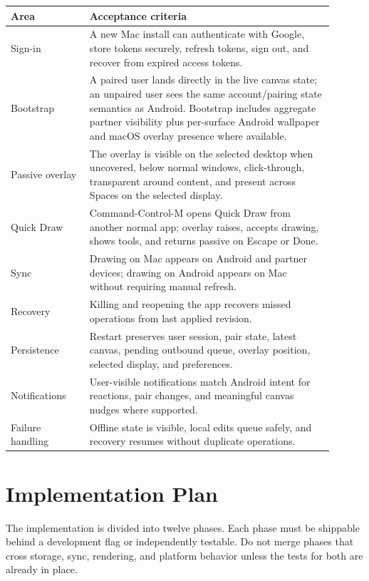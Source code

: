 \documentclass[11pt]{article}
\begin{document}
\begin{longtable}{p{0.22\linewidth} p{0.68\linewidth}}
\toprule
\textbf{Area} & \textbf{Acceptance criteria} \\
\midrule
Sign-in & A new Mac install can authenticate with Google, store tokens securely, refresh tokens, sign out, and recover from expired access tokens. \\
Bootstrap & A paired user lands directly in the live canvas state; an unpaired user sees the same account/pairing state semantics as Android. Bootstrap includes aggregate partner visibility plus per-surface Android wallpaper and macOS overlay presence where available. \\
Passive overlay & The overlay is visible on the selected desktop when uncovered, below normal windows, click-through, transparent around content, and present across Spaces on the selected display. \\
Quick Draw & Command-Control-M opens Quick Draw from another normal app; overlay raises, accepts drawing, shows tools, and returns passive on Escape or Done. \\
Sync & Drawing on Mac appears on Android and partner devices; drawing on Android appears on Mac without requiring manual refresh. \\
Recovery & Killing and reopening the app recovers missed operations from last applied revision. \\
Persistence & Restart preserves user session, pair state, latest canvas, pending outbound queue, overlay position, selected display, and preferences. \\
Notifications & User-visible notifications match Android intent for reactions, pair changes, and meaningful canvas nudges where supported. \\
Failure handling & Offline state is visible, local edits queue safely, and recovery resumes without duplicate operations. \\
\bottomrule
\end{longtable}

\section{Implementation Plan}

The implementation is divided into twelve phases. Each phase must be shippable behind a development flag or independently testable. Do not merge phases that cross storage, sync, rendering, and platform behavior unless the tests for both are already in place.
\end{document}
